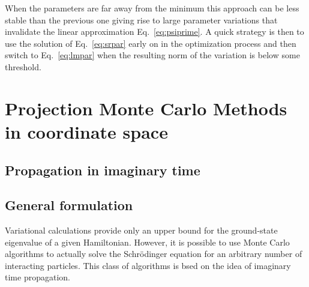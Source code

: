 When the parameters are far away from the minimum this approach can be less stable 
than the previous one giving rise to large parameter variations that
invalidate the linear approximation Eq.~\ref{eq:psiprime}. A quick strategy is then to use 
the solution of Eq.~\eqref{eq:srpar} early on in the optimization process and then switch to
Eq.~\eqref{eq:lmpar} when the resulting norm of the variation is below some threshold.

\section{Projection Monte Carlo Methods in coordinate space}
\subsection{Propagation in imaginary time}
\subsection{General formulation}
\label{sec:generaldmc}
Variational calculations provide only an upper bound for the ground-state eigenvalue of a 
given Hamiltonian. However, it is possible to use Monte Carlo algorithms to actually solve
the Schr\"odinger equation for an arbitrary number of interacting particles. This class of algorithms is bsed on the idea of imaginary time propagation.


